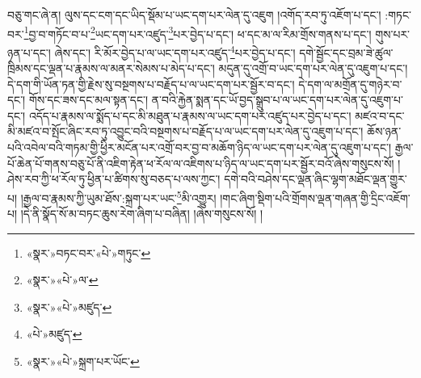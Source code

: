 བཅུ་གང་ཞེ་ན། ལུས་དང་ངག་དང་ཡིད་སྡོམ་པ་ཡང་དག་པར་ལེན་དུ་འཇུག །འགོད་རབ་ཏུ་འཇོག་པ་དང་། :གཏང་བར་\footnote{«སྣར་»བཏང་བར་«པེ་»གཏུང་}བྱ་བ་གཏོང་བ་པ་\footnote{«སྣར་»«པེ་»ལ་}ཡང་དག་པར་འཛུད་\footnote{«སྣར་»«པེ་»མཛུད་}པར་བྱེད་པ་དང་། ཕ་དང་མ་ལ་རིམ་གྲོས་གནས་པ་དང་། གུས་པར་ཉན་པ་དང་། ཞེས་དང་། རི་མོར་བྱེད་པ་ལ་ཡང་དག་པར་འཛུད་\footnote{«པེ་»མཛུད་}པར་བྱེད་པ་དང་། དགེ་སྦྱོང་དང་བྲམ་ཟེ་ཚུལ་ཁྲིམས་དང་ལྡན་པ་རྣམས་ལ་མནར་སེམས་པ་མེད་པ་དང་། མདུན་དུ་འགྲོ་བ་ཡང་དག་པར་ལེན་དུ་འཇུག་པ་དང་། དེ་དག་གི་ཡོན་ཏན་གྱི་རྗེས་སུ་བསྔགས་པ་བརྗོད་པ་ལ་ཡང་དག་པར་སྦྱོར་བ་དང་། དེ་དག་ལ་མགྲོན་དུ་གཉེར་བ་དང་། གོས་དང་ཟས་དང་མལ་སྟན་དང་། ན་བའི་རྐྱེན་སྨན་དང་ཡོ་བྱད་སྒྲུབ་པ་ལ་ཡང་དག་པར་ལེན་དུ་འཇུག་པ་དང་། འདོད་པ་རྣམས་ལ་སྨོད་པ་དང་མི་མཐུན་པ་རྣམས་ལ་ཡང་དག་པར་འཛུད་པར་བྱེད་པ་དང་། མཛའ་བ་དང་མི་མཛའ་བ་སྤོང་ཞིང་རབ་ཏུ་འབྱུང་བའི་བསྔགས་པ་བརྗོད་པ་ལ་ཡང་དག་པར་ལེན་དུ་འཇུག་པ་དང་། ཆོས་ཉན་པའི་འབེལ་བའི་གཏམ་གྱི་ཕྱིར་མངོན་པར་འགྲོ་བར་བྱ་བ་མཆོག་ཉིད་ལ་ཡང་དག་པར་ལེན་དུ་འཇུག་པ་དང་། རྒྱལ་པོ་ཆེན་པོ་གནས་བཅུ་པོ་ནི་འཇིག་རྟེན་ཕ་རོལ་ལ་འཇིགས་པ་ཉིད་ལ་ཡང་དག་པར་སྦྱོར་བའོ་ཞེས་གསུངས་སོ། །ཤེས་རབ་ཀྱི་ཕ་རོལ་ཏུ་ཕྱིན་པ་ཚིགས་སུ་བཅད་པ་ལས་ཀྱང་། དགེ་བའི་བཤེས་དང་ལྡན་ཞིང་ལྷག་མཐོང་ལྡན་གྱུར་པ། །རྒྱལ་བ་རྣམས་ཀྱི་ཡུམ་ཐོས་:སྐྲག་པར་ཡང་\footnote{«སྣར་»«པེ་»སྐྲག་པར་ཡོང་}མི་འགྱུར། །གང་ཞིག་སྡིག་པའི་གྲོགས་ལྡན་གཞན་གྱི་དྲིང་འཇོག་པ། །དེ་ནི་སྣོད་སོ་མ་བཏང་ཆུས་རེག་ཞིག་པ་བཞིན། །ཞེས་གསུངས་སོ། །
